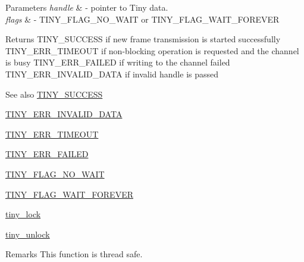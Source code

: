 \begin{DoxyParams}{Parameters}
{\em handle} & -\/ pointer to Tiny data. \\
\hline
{\em flags} & -\/ T\+I\+N\+Y\+\_\+\+F\+L\+A\+G\+\_\+\+N\+O\+\_\+\+W\+A\+I\+T or T\+I\+N\+Y\+\_\+\+F\+L\+A\+G\+\_\+\+W\+A\+I\+T\+\_\+\+F\+O\+R\+E\+V\+E\+R \\
\hline
\end{DoxyParams}
\begin{DoxyReturn}{Returns}
T\+I\+N\+Y\+\_\+\+S\+U\+C\+C\+E\+S\+S if new frame transmission is started successfully T\+I\+N\+Y\+\_\+\+E\+R\+R\+\_\+\+T\+I\+M\+E\+O\+U\+T if non-\/blocking operation is requested and the channel is busy T\+I\+N\+Y\+\_\+\+E\+R\+R\+\_\+\+F\+A\+I\+L\+E\+D if writing to the channel failed T\+I\+N\+Y\+\_\+\+E\+R\+R\+\_\+\+I\+N\+V\+A\+L\+I\+D\+\_\+\+D\+A\+T\+A if invalid handle is passed
\end{DoxyReturn}
\begin{DoxySeeAlso}{See also}
\hyperlink{group__ERROR__FLAGS_ga16cd043c890ed1fa381b3a20f75a626c}{T\+I\+N\+Y\+\_\+\+S\+U\+C\+C\+E\+S\+S} 

\hyperlink{group__ERROR__FLAGS_ga541a9e67a84e39595ad647d641c4df2e}{T\+I\+N\+Y\+\_\+\+E\+R\+R\+\_\+\+I\+N\+V\+A\+L\+I\+D\+\_\+\+D\+A\+T\+A} 

\hyperlink{group__ERROR__FLAGS_gac9ba8076a1eb8613e8d1f07629ff0cd1}{T\+I\+N\+Y\+\_\+\+E\+R\+R\+\_\+\+T\+I\+M\+E\+O\+U\+T} 

\hyperlink{group__ERROR__FLAGS_ga84e6ca143550038e1a71cf36078d1926}{T\+I\+N\+Y\+\_\+\+E\+R\+R\+\_\+\+F\+A\+I\+L\+E\+D} 

\hyperlink{group__FLAGS__GROUP_gadadd60eb21d7949e6d097ad36aab9b2e}{T\+I\+N\+Y\+\_\+\+F\+L\+A\+G\+\_\+\+N\+O\+\_\+\+W\+A\+I\+T} 

\hyperlink{group__FLAGS__GROUP_ga3a34267804581c5709d03f52d232b307}{T\+I\+N\+Y\+\_\+\+F\+L\+A\+G\+\_\+\+W\+A\+I\+T\+\_\+\+F\+O\+R\+E\+V\+E\+R} 

\hyperlink{group__ADVANCED__API_gac318682c20279f9f20ffc6f636a7f1c9}{tiny\+\_\+lock} 

\hyperlink{group__ADVANCED__API_gae4bfad55a4ef5814a5af50f044f6d7cd}{tiny\+\_\+unlock} 
\end{DoxySeeAlso}
\begin{DoxyRemark}{Remarks}
This function is thread safe. 
\end{DoxyRemark}
\hypertarget{group__ADVANCED__API_ga73c9f1cfb0948bd559d3704749db540b}{}
